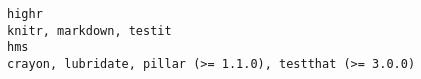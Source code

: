 \documentclass[
  letterpaper,
  DIV=11,
  numbers=noendperiod]{scrreprt}
\begin{document}
\begin{verbatim}
highr                                                                                                                                                                                                                                                                                                                                                                                                                                                                                                                                                                                                                                                                                                                                                                                                                                                                                                                                                                                                                                                                                                                                                                                                                                                                                 knitr, markdown, testit
hms                                                                                                                                                                                                                                                                                                                                                                                                                                                                                                                                                                                                                                                                                                                                                                                                                                                                                                                                                                                                                                                                                                                                                                                                                                                 crayon, lubridate, pillar (>= 1.1.0), testthat (>= 3.0.0)

\end{verbatim}
\end{document}
